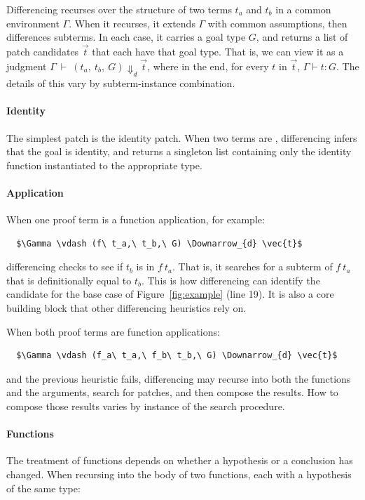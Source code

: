 
Differencing recurses over the structure of two terms $t_a$ and $t_b$ in a common environment $\Gamma$.
When it recurses, it extends $\Gamma$ with common assumptions, then differences subterms.
In each case, it carries a goal type $G$, and returns a list of patch candidates $\vec{t}$ that each have that goal type.
That is, we can view it as a judgment $\Gamma\ \vdash\ (t_a,\ t_b,\ G) \Downarrow_{d} \vec{t}$,
where in the end, for every $t$ in $\vec{t}$, $\Gamma \vdash t : G$.
The details of this vary by subterm-instance combination.

\paragraph{Identity}
The simplest patch is the identity patch.
When two terms are , %
differencing infers that the goal is identity,
and returns a singleton list containing only the identity function instantiated to the appropriate type.

\paragraph{Application}
When one proof term is a function application, for example:

\begin{lstlisting}
  $\Gamma \vdash (f\ t_a,\ t_b,\ G) \Downarrow_{d} \vec{t}$
\end{lstlisting}
differencing checks to see if $t_b$ is in $f\ t_a$.
That is, it searches for a subterm of $f\ t_a$ that is definitionally equal to $t_b$.
This is how differencing can identify the candidate for the base case of Figure~\ref{fig:example} (line 19).
It is also a core building block that other differencing heuristics rely on.

When both proof terms are function applications:

\begin{lstlisting}
  $\Gamma \vdash (f_a\ t_a,\ f_b\ t_b,\ G) \Downarrow_{d} \vec{t}$
\end{lstlisting}
and the previous heuristic fails,
differencing may recurse into both the functions and the arguments, search for patches, and then compose the results.
How to compose those results varies by instance of the search procedure.

\paragraph{Functions} %
The treatment of functions depends on whether a hypothesis or a conclusion has changed.
When recursing into the body of two functions, each with a hypothesis of the same type:

